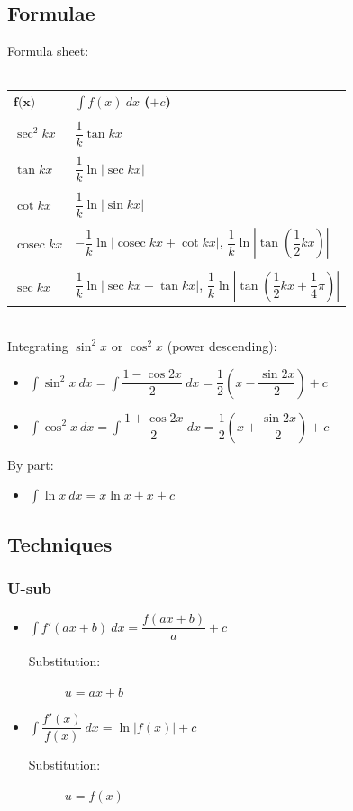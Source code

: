 \documentclass[A4paper]{article}
\DeclareMathOperator\cosec{cosec}
\begin{document}
	\subsection{Formulae}
	Formula sheet:\\\\
	\begin{tabular}{ll}
	$\textbf{f(x)}$	& \textbf{$\int f(x) \: dx$ ($+c$)} \\&\\ 
	$\sec^2kx$	& $\dfrac{1}{k} \tan kx$ \\&\\
	$\tan kx$	& $\dfrac{1}{k} \ln |\sec kx|$ \\&\\
	$\cot kx$	& $\dfrac{1}{k} \ln |\sin kx|$ \\&\\
	$\cosec kx$	& $-\dfrac{1}{k} \ln |\cosec kx + \cot kx|$, $\dfrac{1}{k} \ln |\tan (\dfrac{1}{2}kx)|$ \\&\\
	$\sec kx$	& $\dfrac{1}{k} \ln |\sec kx + \tan kx|$, $\dfrac{1}{k} \ln |\tan (\dfrac{1}{2}kx+\dfrac{1}{4}\pi)|$ \\

	\end{tabular}\\
	Integrating $\sin^2x$ or $\cos^2x$ (power descending):
	\begin{itemize}
		\item $\int \sin ^2 x \: dx=\int \dfrac{1-\cos 2x}{2} \: dx=\dfrac{1}{2}(x-\dfrac{\sin 2x}{2})+c$
		\item $\int \cos ^2 x \: dx=\int \dfrac{1+\cos 2x}{2} \: dx= \dfrac{1}{2}(x+\dfrac{\sin 2x}{2})+c$
	\end{itemize}
	By part:
	\begin{itemize}
		\item $\int \ln x \: dx = x\ln x + x + c$
	\end{itemize}
	\subsection{Techniques}
	\subsubsection{U-sub}
	\begin{itemize}
		\item $\int f'(ax+b) \: dx = \dfrac{f(ax+b)}{a}+c$
		\begin{description}
			\item[Substitution:] $u=ax+b$
		\end{description}
		\item $\int \dfrac{f'(x)}{f(x)} \: dx = \ln |f(x)|+c$
		\begin{description}
			\item[Substitution:] $u=f(x)$
		\end{description}
	\end{itemize}
\end{document}
